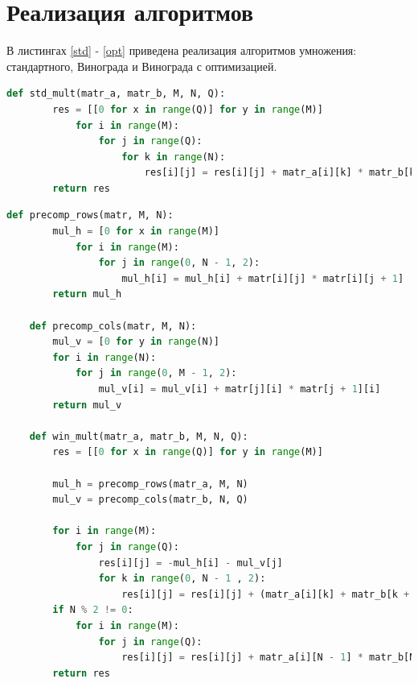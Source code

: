 \documentclass[12pt]{report}
\begin{document}
	\section{Реализация алгоритмов}
	
	В листингах \ref{std} - \ref{opt} приведена реализация алгоритмов умножения: стандартного, Винограда и Винограда с оптимизацией.
	
	\begin{lstlisting}[label=std,caption=Стандартный алгоритм умножения,language=Python]
	def std_mult(matr_a, matr_b, M, N, Q):
		res = [[0 for x in range(Q)] for y in range(M)]
			for i in range(M):
				for j in range(Q):
					for k in range(N):
						res[i][j] = res[i][j] + matr_a[i][k] * matr_b[k][j]
		return res
	\end{lstlisting}

	\newpage
	
	\begin{lstlisting}[label=win,caption=Алгоритм Винограда,language=Python]
	def precomp_rows(matr, M, N):
		mul_h = [0 for x in range(M)]
			for i in range(M):
				for j in range(0, N - 1, 2):
					mul_h[i] = mul_h[i] + matr[i][j] * matr[i][j + 1]
		return mul_h
	
	def precomp_cols(matr, M, N):
		mul_v = [0 for y in range(N)]
		for i in range(N):
			for j in range(0, M - 1, 2):
				mul_v[i] = mul_v[i] + matr[j][i] * matr[j + 1][i]
		return mul_v
	
	def win_mult(matr_a, matr_b, M, N, Q):
		res = [[0 for x in range(Q)] for y in range(M)]
	
		mul_h = precomp_rows(matr_a, M, N)
		mul_v = precomp_cols(matr_b, N, Q)
	
		for i in range(M):
			for j in range(Q):
				res[i][j] = -mul_h[i] - mul_v[j]
				for k in range(0, N - 1 , 2):
					res[i][j] = res[i][j] + (matr_a[i][k] + matr_b[k + 1][j]) * (matr_a[i][k + 1] + matr_b[k][j])
		if N % 2 != 0:
			for i in range(M):
				for j in range(Q):
					res[i][j] = res[i][j] + matr_a[i][N - 1] * matr_b[N - 1][j]
		return res
	\end{lstlisting}

	\newpage
	
\end{document}
